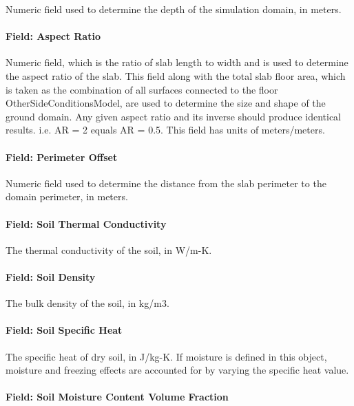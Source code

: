 Numeric field used to determine the depth of the simulation domain, in meters.

\paragraph{Field: Aspect Ratio}\label{field-aspect-ratio}

Numeric field, which is the ratio of slab length to width and is used to determine the aspect ratio of the slab. This field along with the total slab floor area, which is taken as the combination of all surfaces connected to the floor OtherSideConditionsModel, are used to determine the size and shape of the ground domain. Any given aspect ratio and its inverse should produce identical results. i.e. AR = 2 equals AR = 0.5. This field has units of meters/meters.

\paragraph{Field: Perimeter Offset}\label{field-perimeter-offset}

Numeric field used to determine the distance from the slab perimeter to the domain perimeter, in meters.

\paragraph{Field: Soil Thermal Conductivity}\label{field-soil-thermal-conductivity-3}

The thermal conductivity of the soil, in W/m-K.

\paragraph{Field: Soil Density}\label{field-soil-density-3}

The bulk density of the soil, in kg/m3.

\paragraph{Field: Soil Specific Heat}\label{field-soil-specific-heat-3}

The specific heat of dry soil, in J/kg-K. If moisture is defined in this object, moisture and freezing effects are accounted for by varying the specific heat value.

\paragraph{Field: Soil Moisture Content Volume Fraction}\label{field-soil-moisture-content-volume-fraction-1}

